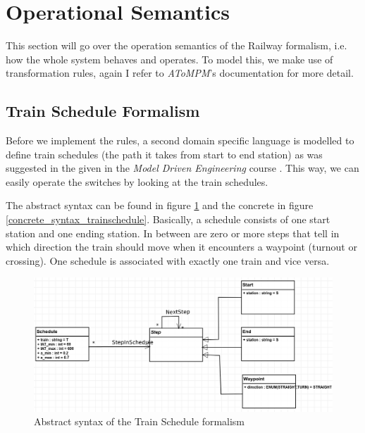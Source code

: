 \documentclass{article}
\begin{document}
\section{Operational Semantics}

This section will go over the operation semantics of the Railway formalism, i.e. how the whole system behaves and operates. To model this, we make use of transformation rules, again I refer to \textit{AToMPM}'s documentation \cite{atompm_docs} for more detail.

\subsection{Train Schedule Formalism}

Before we implement the rules, a second domain specific language is modelled to define train schedules (the path it takes from start to end station) as was suggested in the \cite{assignments} given in the \textit{Model Driven Engineering} course \cite{assignments}. This way, we can easily operate the switches by looking at the train schedules.

The abstract syntax can be found in figure \ref{abstract_syntax_trainschedule} and the concrete in figure \ref{concrete_syntax_trainschedule}. Basically, a schedule consists of one start station and one ending station. In between are zero or more steps that tell in which direction the train should move when it encounters a waypoint (turnout or crossing). One schedule is associated with  exactly one train and vice versa.

\begin{figure}[H]
    \centering
    \includegraphics[width=\textwidth]{images/trainschedule_abstract_syntax.png}
    \caption{Abstract syntax of the Train Schedule formalism}
    \label{abstract_syntax_trainschedule}
\end{figure}
\end{document}
